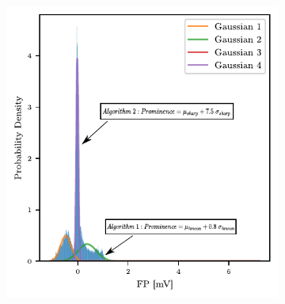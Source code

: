 \documentclass{report}
\begin{document}

            \begin{figure}[h]
                \centering
                 \begin{subfigure}[b]{0.45\textwidth}
                    \includegraphics[width=\textwidth,keepaspectratio]{plots/chapter_3/mea_denoised_gmm_components_annotaed_2.pdf}
                    \caption[GMM-based prominence threshold determination]{}

\end{subfigure}
\end{figure}
\end{document}
